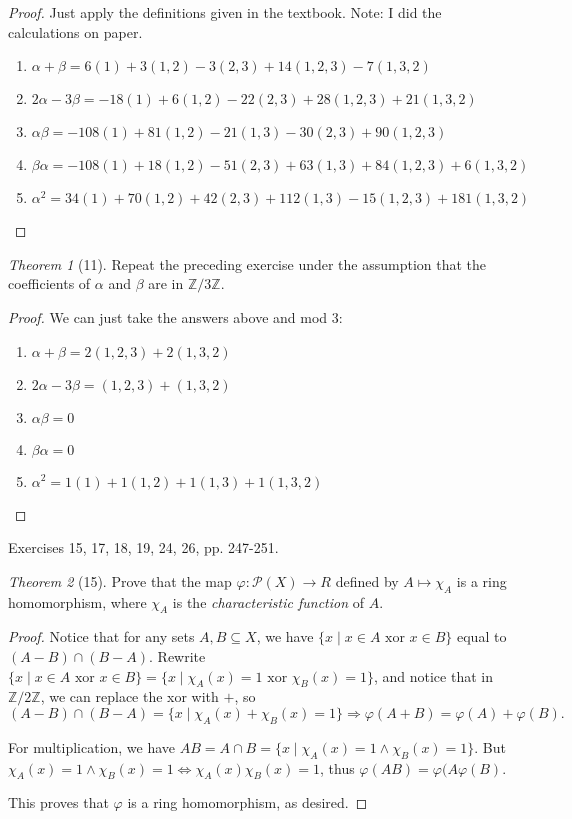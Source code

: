\documentclass[12pt]{article}
\theoremstyle{remark}
\theoremstyle{named}
\newtheorem*{theorem}{Theorem}
\renewcommand{\a}{\alpha}
\renewcommand{\b}{\beta}
\newcommand{\Z}{\mathbb Z}
\begin{document}
\begin{proof}
    Just apply the definitions given in the textbook. Note: I did the calculations on paper.
    \begin{enumerate}
        \item \(\a + \b = 6(1) + 3(1, 2) - 3(2, 3) + 14(1, 2, 3) - 7(1, 3, 2)\)
        \item $2\a - 3\b = -18(1) + 6(1, 2) - 22(2, 3) + 28 (1,2,3) + 21(1, 3, 2)$
        \item \(\a\b = -108 (1) + 81(1, 2) - 21(1, 3) - 30 (2, 3) + 90(1, 2, 3)\) 
        \item $\b\a = -108(1) + 18(1, 2) - 51(2, 3) + 63(1, 3) + 84(1, 2, 3) + 6(1, 3, 2)$
        \item $\a^2 = 34(1) + 70(1, 2) + 42(2, 3) + 112 (1, 3) - 15(1, 2, 3) + 181 (1, 3, 2)$
    \end{enumerate}
\end{proof}

\begin{theorem}[11]
    Repeat the preceding exercise under the assumption that the coefficients of \(\a\) and \(\b\) are in \(\Z / 3\Z\).
\end{theorem}

\begin{proof}
    We can just take the answers above and mod 3:
    \begin{enumerate}
        \item \(\a + \b = 2(1, 2, 3) + 2(1, 3, 2)\)
        \item $2\a - 3\b = (1, 2, 3) + (1, 3, 2)$
        \item \(\a\b = 0\) 
        \item $\b\a = 0$
        \item $\a^2 = 1(1) + 1(1, 2) + 1 (1, 3) + 1 (1, 3, 2)$
    \end{enumerate}
\end{proof}

Exercises 15, 17, 18, 19, 24, 26, pp. 247-251.

\begin{theorem}[15]
    Prove that the map \(\varphi : \mathcal P(X) \to R\) defined by \(A \mapsto \chi_A\) is a ring homomorphism, where \(\chi_A\) is the \textit{characteristic function} of \(A\). 
\end{theorem}

\begin{proof}
    Notice that for any sets $A, B \subseteq X$, we have $\{x \mid x \in A \text{ xor } x \in B\}$ equal to $(A - B) \cap (B - A)$. Rewrite $\{x \mid x \in A \text{ xor } x \in B\} = \{x \mid \chi_A(x) = 1 \text{ xor } \chi_B(x) = 1\}$, and notice that in $\Z / 2 \Z$, we can replace the xor with $+$, so $$(A - B) \cap (B - A) = \{x \mid \chi_A(x) + \chi_B(x) = 1\} \Rightarrow \varphi(A + B) = \varphi(A) + \varphi(B).$$
    
    For multiplication, we have $AB = A \cap B = \{x \mid \chi_A(x) = 1 \land \chi_B(x) = 1\}$. But $\chi_A(x) = 1 \land \chi_B(x) = 1 \iff \chi_A(x)\chi_B(x) = 1$, thus $\varphi(AB) = \varphi(A \varphi(B)$. 
    
    This proves that $\varphi$ is a ring homomorphism, as desired. 
\end{proof}
\end{document}
